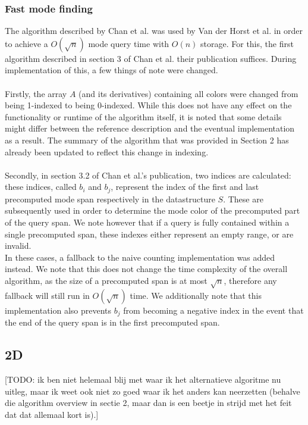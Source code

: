 \documentclass{article}
\newcommand{\todo}[1]{{\color{red}[#1]}}
\begin{document}
\subsubsection{Fast mode finding}
The algorithm described by Chan et al. \cite{Chan2014} was used by Van der
Horst et al. in order to achieve a $O(\sqrt{n})$ mode query time with $O(n)$
storage. For this, the first algorithm described in section 3 of Chan et al.
their publication suffices. During implementation of this, a few things of note
were changed.\\\\ Firstly, the array $A$ (and its derivatives) containing all
colors were changed from being 1-indexed to being 0-indexed. While this does
not have any effect on the functionality or runtime of the algorithm itself, it
is noted that some details might differ between the reference description and
the eventual implementation as a result. The summary of the algorithm that was
provided in Section 2 has already been updated to reflect this change in
indexing.\\\\ Secondly, in section 3.2 of Chan et al.'s publication, two
indices are calculated: these indices, called $b_i$ and $b_j$, represent the
index of the first and last precomputed mode span respectively in the
datastructure $S$. These are subsequently used in order to determine the mode
color of the precomputed part of the query span. We note however that if a
query is fully contained within a single precomputed span, these indexes either
represent an empty range, or are invalid. \\ In these cases, a fallback to the
naive counting implementation was added instead. We note that this does not
change the time complexity of the overall algorithm, as the size of a
precomputed span is at most $\sqrt{n}$, therefore any fallback will still run
in $O(\sqrt{n})$ time. We additionally note that this implementation also
prevents $b_j$ from becoming a negative index in the event that the end of the
query span is in the first precomputed span.
\subsection{2D}
\todo{TODO: ik ben niet helemaal blij met waar ik het alternatieve algoritme nu
    uitleg, maar ik weet ook niet zo goed waar ik het anders kan neerzetten
    (behalve die algorithm overview in sectie 2, maar dan is een beetje in strijd
    met het feit dat dat allemaal kort is).}
\end{document}
